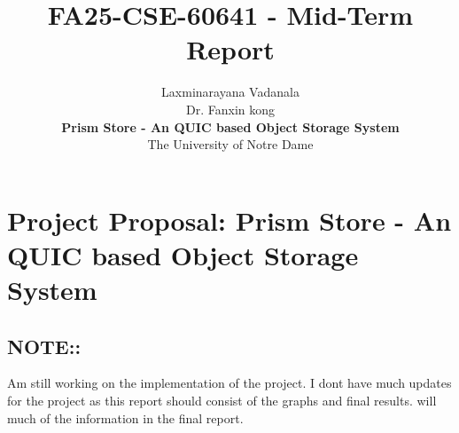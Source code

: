\documentclass[12pt]{article}
\newcommand\defaultstyle{\everymath{\displaystyle}}
\begin{document}
\defaultstyle
\title{\vspace{-8ex}FA25-CSE-60641 - Mid-Term Report}

\author
    {
        Laxminarayana Vadanala\\
        Dr. Fanxin kong\\
        \textbf{Prism Store - An QUIC based Object Storage System}\\
        The University of Notre Dame \vspace{-1.75ex}
    }

\maketitle


\section*{Project Proposal: Prism Store - An QUIC based Object Storage System}


\subsection*{NOTE::}
Am still working on the implementation of the project. I dont have much updates for the project as this report should
consist of the graphs and final results. will much of the information in the final report.
\end{document}
